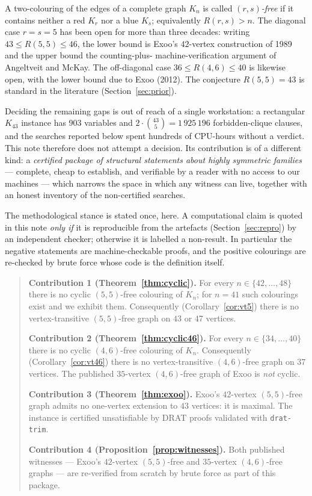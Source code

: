 \documentclass[11pt]{article}
\theoremstyle{definition}
\theoremstyle{plain}
\newcommand{\K}{\ensuremath{K}}
\newcommand{\R}[2]{\ensuremath{R(#1,#2)}}
\begin{document}
A two-colouring of the edges of a complete graph $\K_n$ is called
\emph{$(r,s)$-free} if it contains neither a red $\K_r$ nor a blue $\K_s$;
equivalently $\R{r}{s} > n$. The diagonal case $r=s=5$ has been open for more
than three decades: writing $43 \le \R{5}{5} \le 46$, the lower bound is
Exoo's $42$-vertex construction of 1989 and the upper bound the counting-plus-
machine-verification argument of Angeltveit and McKay. The off-diagonal case
$36 \le \R{4}{6} \le 40$ is likewise open, with the lower bound due to Exoo
(2012). The conjecture $\R{5}{5} = 43$ is standard in the literature
(Section~\ref{sec:prior}).

Deciding the remaining gaps is out of reach of a single workstation: a
rectangular $\K_{43}$ instance has $903$ variables and $2 \cdot \binom{43}{5}
= 1\,925\,196$ forbidden-clique clauses, and the searches reported below spent
hundreds of CPU-hours without a verdict. This note therefore does not attempt
a decision. Its contribution is of a different kind: a \emph{certified
package of structural statements about highly symmetric families} --- complete,
cheap to establish, and verifiable by a reader with no access to our machines
--- which narrows the space in which any witness can live, together with an
honest inventory of the non-certified searches.

The methodological stance is stated once, here. A computational claim is
quoted in this note \emph{only if} it is reproducible from the artefacts
(Section~\ref{sec:repro}) by an independent checker; otherwise it is labelled a
non-result. In particular the negative statements are machine-checkable
proofs, and the positive colourings are re-checked by brute force whose code
is the definition itself.

\begin{quote}
\textbf{Contribution 1 (Theorem~\ref{thm:cyclic}).} For every $n \in
\{42,\dots,48\}$ there is no cyclic $(5,5)$-free colouring of $\K_n$; for
$n = 41$ such colourings exist and we exhibit them. Consequently
(Corollary~\ref{cor:vt5}) there is no vertex-transitive $(5,5)$-free graph on
$43$ or $47$ vertices.

\textbf{Contribution 2 (Theorem~\ref{thm:cyclic46}).} For every $n \in
\{34,\dots,40\}$ there is no cyclic $(4,6)$-free colouring of $\K_n$.
Consequently (Corollary~\ref{cor:vt46}) there is no vertex-transitive
$(4,6)$-free graph on $37$ vertices. The published $35$-vertex
$(4,6)$-free graph of Exoo is \emph{not} cyclic.

\textbf{Contribution 3 (Theorem~\ref{thm:exoo}).} Exoo's $42$-vertex
$(5,5)$-free graph admits no one-vertex extension to $43$ vertices: it is
maximal. The instance is certified unsatisfiable by DRAT proofs validated with
\texttt{drat-trim}.

\textbf{Contribution 4 (Proposition~\ref{prop:witnesses}).} Both published
witnesses --- Exoo's $42$-vertex $(5,5)$-free and $35$-vertex $(4,6)$-free
graphs --- are re-verified from scratch by brute force as part of this package.
\end{quote}
\end{document}
